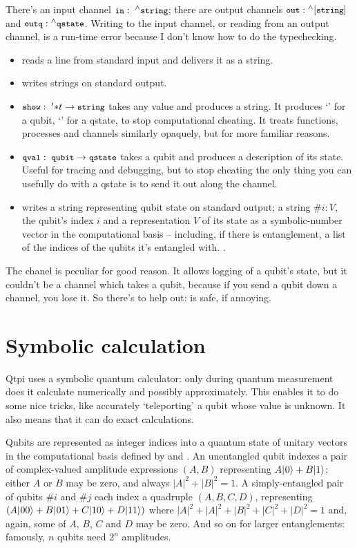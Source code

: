 There's an input channel $\texttt{\small{}in}:\; {}^{\wedge}{}\texttt{\small{}string}$; there are output channels $\texttt{\small{}out}: {}^{\wedge}{}[\texttt{\small{}string}]$ and $\texttt{\small{}outq}: {}^{\wedge}{}\texttt{\small{}qstate}$. Writing to the input channel, or reading from an output channel, is a run-time error because I don't know how to do the typechecking.
\begin{itemize}
\item {} reads a line from standard input and delivers it as a string. 
\item {} writes strings on standard output. 
\item $\texttt{\small{}show}:\; '{*}t->\texttt{\small{}string}$ takes any value and produces a string. It produces `' for a qubit, `' for a qstate, to stop computational cheating. It treats functions, processes and channels similarly opaquely, but for more familiar reasons.
\item $\texttt{\small{}qval}:\; \texttt{\small{}qubit} ->\texttt{\small{}qstate}$ takes a qubit and produces a description of its state. Useful for tracing and debugging, but to stop cheating the only thing you can usefully do with a qstate is to send it out along the  channel.
\item {} writes a string representing qubit state  on standard output; a string $\#i:V$, the qubit's index $i$ and a representation $V$ of its state as a symbolic-number vector in the computational basis -- including, if there is entanglement, a list of the indices of the qubits it's entangled with.
.
\end{itemize}

The  chanel is peculiar for good reason. It allows logging of a qubit's state, but it couldn't be a channel which takes a qubit, because if you send a qubit down a channel, you lose it. So there's  to help out:  is safe, if annoying. 

\section{Symbolic calculation}

Qtpi uses a symbolic quantum calculator: only during quantum measurement does it calculate numerically and possibly approximately. This enables it to do some nice tricks, like accurately `teleporting' a qubit whose value is unknown. It also means that it can do exact calculations.

Qubits are represented as integer indices into a quantum state of unitary vectors in the computational basis defined by \zero{} and \one. An unentangled qubit indexes a pair of complex-valued amplitude expressions $(A, B)$ representing $A|\hspace{0.5pt}0\rangle+B|1\rangle\relax$; either $A$ or $B$ may be zero, and always $|A|^{2}+|B|^{2}=1$. A simply-entangled pair of qubits $\#i$ and $\#j$ each index a quadruple $(A,B,C,D)$, representing $(A|\hspace{0.5pt}00\rangle+B|\hspace{0.5pt}01\rangle+C|10\rangle+D|11\rangle)$ where $|A|^{2}+|A|^{2}+|B|^{2}+|C|^{2}+|D|^{2}=1$ and, again, some of $A$, $B$, $C$ and $D$ may be zero. And so on for larger entanglements: famously, $n$ qubits need $2^{n}$ amplitudes.

